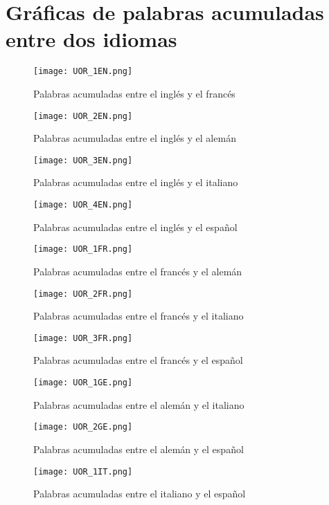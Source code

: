 \section{Gráficas de palabras acumuladas entre dos idiomas}
\label{palabras.acumuladas.apendice}

\begin{figure}[h!]
	\centering
	\texttt{[image: UOR\_1EN.png]}
	\label{fig.U_EF}
	\caption{Palabras acumuladas entre el inglés y el francés}
\end{figure}


\begin{figure}[h!]
	\centering
	\texttt{[image: UOR\_2EN.png]}
	\label{fig.U_EG}
	\caption{Palabras acumuladas entre el inglés y el alemán}
\end{figure}


\begin{figure}[h!]
	\centering
	\texttt{[image: UOR\_3EN.png]}
	\label{fig.U_EI}
	\caption{Palabras acumuladas entre el inglés y el italiano}
\end{figure}

\begin{figure}[h!]
	\centering
	\texttt{[image: UOR\_4EN.png]}
	\label{fig.U_ES}
	\caption{Palabras acumuladas entre el inglés y el español}
\end{figure}

\begin{figure}[h!]
	\centering
	\texttt{[image: UOR\_1FR.png]}
	\label{fig.U_FG}
	\caption{Palabras acumuladas entre el francés y el alemán}
\end{figure}

\begin{figure}[h!]
	\centering
	\texttt{[image: UOR\_2FR.png]}
	\label{fig.U_FI}
	\caption{Palabras acumuladas entre el francés y el italiano}
\end{figure}

\begin{figure}[h!]
	\centering
	\texttt{[image: UOR\_3FR.png]}
	\label{fig.U_FS}
	\caption{Palabras acumuladas entre el francés y el español}
\end{figure}



\begin{figure}[h!]
	\centering
	\texttt{[image: UOR\_1GE.png]}
	\label{fig.U_GI}
	\caption{Palabras acumuladas entre el alemán y el italiano}
\end{figure}


\begin{figure}[h!]
	\centering
	\texttt{[image: UOR\_2GE.png]}
	\label{fig.U_GS}
	\caption{Palabras acumuladas entre el alemán y el español}
\end{figure}


\begin{figure}[h!]
	\centering
	\texttt{[image: UOR\_1IT.png]}
	\label{fig.U_IS}
	\caption{Palabras acumuladas entre el italiano y el español}
\end{figure}
